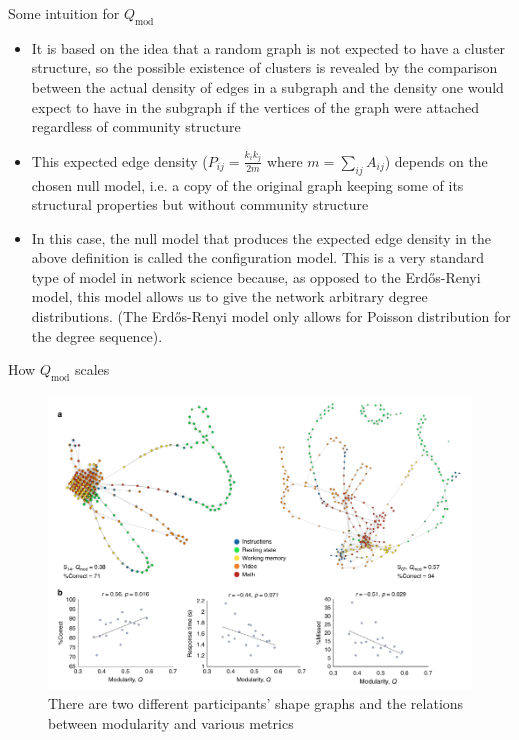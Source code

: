 \documentclass[handout]{beamer}
\begin{document}
\begin{frame}{Some intuition for $Q_{\mathrm{mod}}$}
    \begin{itemize}
        \item It is based on the idea that a random graph is not expected to have a cluster structure, so the possible existence of clusters is revealed by the comparison between the actual density of edges in a subgraph and the density one would expect to have in the subgraph if the vertices of the graph
        were attached regardless of community structure\cite{originalcommunity}
        \item This expected edge density ($P_{ij} = \frac{k_ik_j}{2m}$ where $m = \sum_{ij}A_{ij}$) depends on the chosen null model, i.e. a copy of the original graph keeping some of its structural properties but without community structure\cite{community}\pause
        \item In this case, the null model that produces the expected edge density in the above definition is called the configuration model\cite{configurationmodel}. This is a very standard type of model in network science because, as opposed to the Erd\H{o}s-Renyi model, this model allows us to give the network arbitrary degree distributions. (The Erd\H{o}s-Renyi model only allows for Poisson distribution for the degree sequence).
    \end{itemize}
\end{frame}

\begin{frame}{How $Q_{\mathrm{mod}}$ scales}
    \begin{figure}
        \includegraphics[width = 0.75\linewidth]{fig3.png}
        \caption{There are two different participants' shape graphs and the relations between modularity and various metrics}
    \end{figure}
\end{frame}
\end{document}
